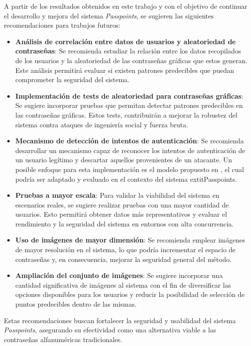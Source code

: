 \begin{recomendations}
 
   A partir de los resultados obtenidos en este trabajo y con el objetivo de continuar el desarrollo y mejora del sistema \textit{Passpoints}, se sugieren las siguientes recomendaciones para trabajos futuros:
   
   \begin{itemize}
   	\item 	\textbf{Análisis de correlación entre datos de usuarios y aleatoriedad de contraseñas}: Se recomienda estudiar la relación entre los datos recopilados de los usuarios y la aleatoriedad de las contraseñas gráficas que estos generan. Este análisis permitirá evaluar si existen patrones predecibles que puedan comprometer la seguridad del sistema.
   	
   	\item 	\textbf{Implementación de tests de aleatoriedad para contraseñas gráficas}: Se sugiere incorporar pruebas que permitan detectar patrones predecibles en las contraseñas gráficas. Estos tests, contribuirán a mejorar la robustez del sistema contra ataques de ingeniería social y fuerza bruta.
   	
   	\item 	\textbf{Mecanismo de detección de intentos de autenticación}: Se recomienda desarrollar un mecanismo capaz de reconocer los intentos de autenticación de un usuario legítimo y descartar aquellos provenientes de un atacante. Un posible enfoque para esta implementación es el modelo propuesto en \cite{legon2019nuevo}, el cual podría ser adaptado y evaluado en el contexto del sistema 	extit{Passpoints}.
   	
   	\item 	\textbf{Pruebas a mayor escala}: Para validar la viabilidad del sistema en escenarios reales, se sugiere realizar pruebas con una mayor cantidad de usuarios. Esto permitirá obtener datos más representativos y evaluar el rendimiento y la seguridad del sistema en entornos con alta concurrencia.
   	
   	\item 	\textbf{Uso de imágenes de mayor dimensión}: Se recomienda emplear imágenes de mayor resolución en el sistema, lo que podría incrementar el espacio de contrase\~nas y, en consecuencia, mejorar la seguridad general del método.
   	
   	\item 	\textbf{Ampliación del conjunto de imágenes}: Se sugiere incorporar una cantidad significativa de imágenes al sistema con el fin de diversificar las opciones disponibles para los usuarios y reducir la posibilidad de selección de puntos predecibles dentro de las mismas.
   	
   \end{itemize}
   
   Estas recomendaciones buscan fortalecer la seguridad y usabilidad del sistema \textit{Passpoints}, asegurando su efectividad como una alternativa viable a las contraseñas alfanuméricas tradicionales.
\end{recomendations}
